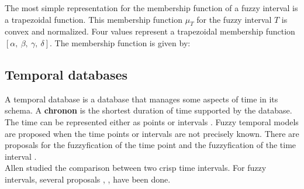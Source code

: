 \documentclass[twoside,twocolumn,a4paper]{article}
\begin{document}
The most simple representation for the membership function of a fuzzy interval is a trapezoidal function. This membership function $\mu_T$ for the fuzzy interval $T$ is convex and normalized. Four values represent a trapezoidal membership function %
 $\left[\alpha,\ \beta,\ \gamma,\ \delta\right]$. The membership function is given by:

%



\subsection{\label{subsec:temporal}Temporal databases}
A temporal database \cite{Dyreson1994} is a database that manages some aspects of time in its schema. A \textbf{chronon} is the shortest duration of time supported by the database. The time can be represented either as points or intervals \cite{655777}. Fuzzy temporal models \cite{4481150} are proposed when the time points or intervals are not precisely known. There are proposals for the  fuzzyfication of the time point \cite{Dubois89} and the fuzzyfication of the time interval \cite{Garrido2009}.\\
Allen \cite{Allen:1983:MKT:182.358434} studied the comparison between two crisp time intervals. For fuzzy intervals, several proposals \cite{4481150}, \cite{springerlink:10.1007/978-3-540-39964-3_57},\cite{10.1109/TIME.2004.1314418} have been done.
\end{document}
